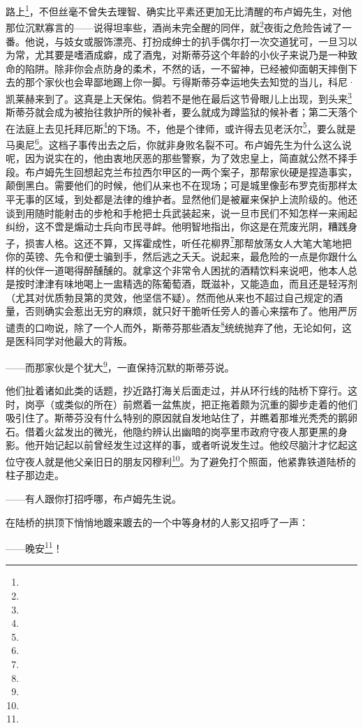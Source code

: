 \par 路上\footnote{}，不但丝毫不曾失去理智、确实比平素还更加无比清醒的布卢姆先生，对他那位沉默寡言的——说得坦率些，酒尚未完全醒的同伴，就\footnote{}夜街之危险告诫了一番。他说，与妓女或服饰漂亮、打扮成绅士的扒手偶尔打一次交道犹可，一旦习以为常，尤其要是嗜酒成癖，成了酒鬼，对斯蒂芬这个年龄的小伙子来说乃是一种致命的陷阱。除非你会点防身的柔术，不然的话，一不留神，已经被仰面朝天摔倒下去的那个家伙也会卑鄙地踢上你一脚。亏得斯蒂芬幸运地失去知觉的当儿，科尼·凯莱赫来到了。这真是上天保佑。倘若不是他在最后这节骨眼儿上出现，到头来\footnote{}斯蒂芬就会成为被抬往救护所的候补者，要么就成为蹲监狱的候补者；第二天落个在法庭上去见托拜厄斯\footnote{}的下场。不，他是个律师，或许得去见老沃尔\footnote{}，要么就是马奥尼\footnote{}。这档子事传出去之后，你就非身败名裂不可。布卢姆先生为什么这么说呢，因为说实在的，他由衷地厌恶的那些警察，为了效忠皇上，简直就公然不择手段。布卢姆先生回想起克兰布拉西尔甲区的一两个案子，那帮家伙硬是捏造事实，颠倒黑白。需要他们的时候，他们从来也不在现场；可是城里像彭布罗克街那样太平无事的区域，到处都是法律的维护者。显然他们是被雇来保护上流阶级的。他还谈到用随时能射击的步枪和手枪把士兵武装起来，说一旦市民们不知怎样一来闹起纠纷，这不啻是煽动士兵向市民寻衅。他明智地指出，你这是在荒废光阴，糟践身子，损害人格。这还不算，又挥霍成性，听任花柳界\footnote{}那帮放荡女人大笔大笔地把你的英镑、先令和便士骗到手，然后逃之夭夭。说起来，最危险的一点是你跟什么样的伙伴一道喝得醉醺醺的。就拿这个非常令人困扰的酒精饮料来说吧，他本人总是按时津津有味地喝上一盅精选的陈葡萄酒，既滋补，又能造血，而且还是轻泻剂（尤其对优质勃艮第的灵效，他坚信不疑）。然而他从来也不超过自己规定的酒量，否则确实会惹出无穷的麻烦，就只好干脆听任旁人的善心来摆布了。他用严厉谴责的口吻说，除了一个人而外，斯蒂芬那些酒友\footnote{}统统抛弃了他，无论如何，这是医科同学对他最大的背叛。
\par ——而那家伙是个犹大\footnote{}，一直保持沉默的斯蒂芬说。
\par 他们扯着诸如此类的话题，抄近路打海关后面走过，并从环行线的陆桥下穿行。这时，岗亭（或类似的所在）前燃着一盆焦炭，把正拖着颇为沉重的脚步走着的他们吸引住了。斯蒂芬没有什么特别的原因就自发地站住了，并瞧着那堆光秃秃的鹅卵石。借着火盆发出的微光，他隐约辨认出幽暗的岗亭里市政府守夜人那更黑的身影。他开始记起以前曾经发生过这样的事，或者听说发生过。他绞尽脑汁才忆起这位守夜人就是他父亲旧日的朋友冈穆利\footnote{}。为了避免打个照面，他紧靠铁道陆桥的柱子那边走。
\par ——有人跟你打招呼哪，布卢姆先生说。
\par 在陆桥的拱顶下悄悄地踱来踱去的一个中等身材的人影又招呼了一声：
\par ——晚安\footnote{}！
